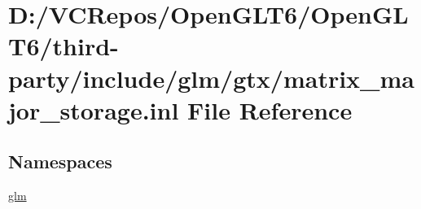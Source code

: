 \hypertarget{matrix__major__storage_8inl}{}\section{D\+:/\+V\+C\+Repos/\+Open\+G\+L\+T6/\+Open\+G\+L\+T6/third-\/party/include/glm/gtx/matrix\+\_\+major\+\_\+storage.inl File Reference}
\label{matrix__major__storage_8inl}
\subsection*{Namespaces}
\begin{DoxyCompactItemize}
\item 
 \mbox{\hyperlink{namespaceglm}{glm}}
\end{DoxyCompactItemize}
